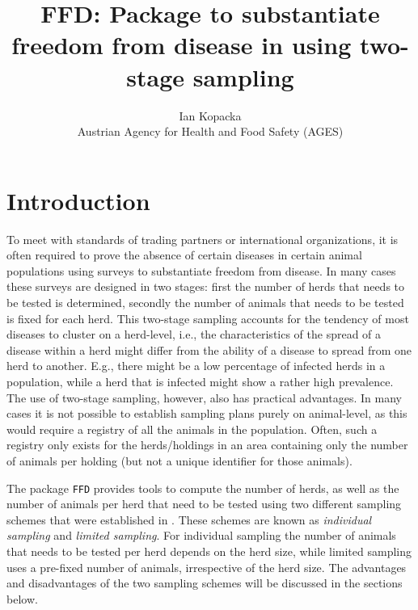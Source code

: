 \documentclass[nojss]{jss}
\title{FFD: Package to substantiate freedom from disease in 
\proglang{R} using two-stage sampling}
\author{Ian Kopacka\\Austrian Agency for Health and Food Safety (AGES)}
\begin{document}
%
%

%


\section{Introduction}
\label{sec:introduction}

To meet with standards of trading partners or international 
organizations, it is often required to prove the absence of certain 
diseases in certain animal populations using surveys to substantiate 
freedom from disease. In many cases these surveys are designed in 
two stages: first the number of herds that needs to be tested is 
determined, secondly the number of animals that needs to be tested 
is fixed for each herd. This two-stage sampling accounts for the 
tendency of most diseases to cluster on a herd-level, i.e., the 
characteristics of the spread of a disease within a herd might 
differ from the ability of a disease to spread from one herd to 
another. E.g., there might be a low percentage of infected herds in 
a population, while a herd that is infected might show a rather high 
prevalence. The use of two-stage sampling, however, also has 
practical advantages. In many cases it is not possible to establish 
sampling plans purely on animal-level, as this would require a 
registry of all the animals in the population. Often, such a 
registry only exists for the herds/holdings in an area containing 
only the number of animals per holding (but not a unique identifier 
for those animals). 

The package \texttt{FFD} provides tools to compute the number of 
herds, as well as the number of animals per herd that need to be 
tested using two different sampling schemes that were established in 
\cite{Ziller02}. These schemes are known as \emph{individual 
sampling} and \emph{limited sampling}. For individual sampling the 
number of animals that needs to be tested per herd depends on the 
herd size, while limited sampling uses a pre-fixed number of 
animals, irrespective of the herd size. The advantages and 
disadvantages of the two sampling schemes will be discussed in the 
sections below.  
\end{document}
